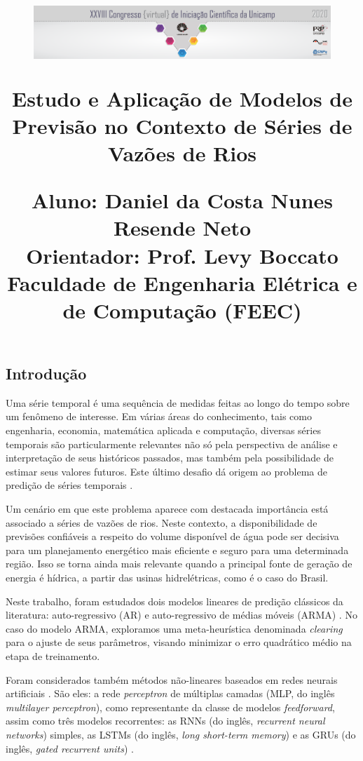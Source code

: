 \documentclass[a4paper]{article}
\title{

\vspace{-45pt}

\begin{figure}[htbp]
    \centering
        \includegraphics[width=1\textwidth]{Imagem_PIBIC.png}
    \label{fig:logo}
\end{figure}
\vspace{-20pt}
  \textbf{\large{Estudo e Aplicação de Modelos de Previsão no Contexto de Séries de Vazões de Rios}}
\vspace{-5pt}
\begin{center}
  \normalsize{
  Aluno: Daniel da Costa Nunes Resende Neto 
  \\
  Orientador: Prof. Levy Boccato
  \\
  Faculdade de Engenharia Elétrica e de Computação (FEEC)
  }
\end{center}

\vspace{-45pt}

}
\date{}
\author{}
\begin{document}
\begin{titlepage}
 \maketitle
 \thispagestyle{empty}
\end{titlepage}


\sloppy
    
\begin{multicols}{2}
\raggedcolumns
\section{Introdução}
\label{sec:introducao}
    
    Uma série temporal é uma sequência de medidas feitas ao longo do tempo sobre um fenômeno de interesse. Em várias áreas do conhecimento, tais como engenharia, economia, matemática aplicada e computação, diversas séries temporais são particularmente relevantes não só pela perspectiva de análise e interpretação de seus históricos passados, mas também pela possibilidade de estimar seus valores futuros. Este último desafio dá origem ao problema de predição de séries temporais \cite{Box-Jenkins}.
    
    Um cenário em que este problema aparece com destacada importância está associado a séries de vazões de rios. Neste contexto, a disponibilidade de previsões confiáveis a respeito do volume disponível de água pode ser decisiva para um planejamento energético mais eficiente e seguro para uma determinada região. Isso se torna ainda mais relevante quando a principal fonte de geração de energia é hídrica, a partir das usinas hidrelétricas, como é o caso do Brasil.
    
    Neste trabalho, foram estudados dois modelos lineares de predição clássicos da literatura: auto-regressivo (AR) e auto-regressivo de médias móveis (ARMA) \cite{Box-Jenkins}. No caso do modelo ARMA, exploramos uma meta-heurística denominada \textit{clearing} \cite{Levy2010, goldberg} para o ajuste de seus parâmetros, visando minimizar o erro quadrático médio na etapa de treinamento.
    
    Foram considerados também métodos não-lineares baseados em redes neurais artificiais \cite{Geron}. São eles: a rede \textit{perceptron} de múltiplas camadas (MLP, do inglês \emph{multilayer perceptron}), como representante da classe de modelos \emph{feedforward}, assim como três modelos recorrentes: as RNNs (do inglês, \emph{recurrent neural networks}) simples, as LSTMs (do inglês, \emph{long short-term memory}) \cite{LSTM} e as GRUs (do inglês, \emph{gated recurrent units}) \cite{GRU2}.
    

\end{multicols}
\end{document}
